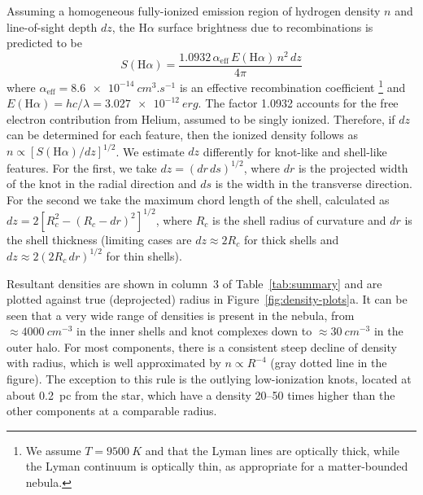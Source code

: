 \documentclass[useAMS, usenatbib]{mnras}
\newcommand\Ha{\ensuremath{\mathrm{H}\alpha}}
\begin{document}
Assuming a homogeneous fully-ionized emission region of hydrogen density \(n\) and line-of-sight depth \(dz\), the \Ha{} surface brightness due to recombinations is predicted to be 
\begin{equation}
  \label{eq:sha-density}
  S(\Ha) = \frac{1.0932\, \alpha_{\text{eff}}\, E(\Ha) \, n^2 \, dz} {4\pi}
\end{equation}
where \(\alpha_{\text{eff}} = \SI{8.6e-14}{cm^{3}.s^{-1}}\) is an effective recombination coefficient \citep{Osterbrock:2006a}%
\footnote{We assume \(T = \SI{9500}{K}\) and that the Lyman lines are optically thick, while the Lyman continuum is optically thin, as appropriate for a matter-bounded nebula.}
and \(E(\Ha) = h c / \lambda = \SI{3.027e-12}{erg}\).
The factor \num{1.0932} accounts for the free electron contribution from Helium, assumed to be singly ionized.
Therefore, if \(dz\) can be determined for each feature, then the ionized density follows as \(n \propto [S(\Ha) / dz]^{1/2}\).
We estimate \(dz\) differently for knot-like and shell-like features.
For the first, we take \(dz = (dr\, ds)^{1/2}\), where \(dr\) is the projected width of the knot in the radial direction and \(ds\) is the width in the transverse direction.
For the second we take the maximum chord length of the shell, calculated as \(dz = 2 [R_c^2 - (R_c - dr)^2]^{1/2}\), where \(R_c\) is the shell radius of curvature and \(dr\) is the shell thickness
(limiting cases are \(dz \approx 2 R_c\) for thick shells and \(dz \approx 2 (2 R_c\, dr)^{1/2}\) for thin shells).

Resultant densities are shown in column~3 of Table~\ref{tab:summary} and are plotted against true (deprojected) radius in Figure~\ref{fig:density-plots}a.
It can be seen that a very wide range of densities is present in the nebula, from \(\approx \SI{4000}{cm^{-3}}\) in the inner shells and knot complexes down to \(\approx \SI{30}{cm^{-3}}\) in the outer halo.
For most components, there is a consistent steep decline of density with radius,
which is well approximated by \(n \propto R^{-4}\) (gray dotted line in the figure).
The exception to this rule is the outlying low-ionization knots,
located at about \SI{0.2}{pc} from the star, which have a density 20--50 times higher than the other components at a comparable radius.
\end{document}
